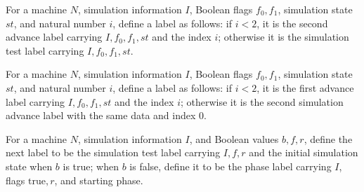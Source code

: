 \begin{definition}
\label{Complexity.Codec.sA2}
\leanok
{}
For a machine $N$, simulation information $I$, Boolean flags $f_0,f_1$, simulation state
$st$, and natural number $i$, define a label as follows: if $i<2$, it is the second
advance label carrying $I,f_0,f_1,st$ and the index $i$; otherwise it is the simulation
test label carrying $I,f_0,f_1,st$.
\end{definition}

\begin{definition}
\label{Complexity.Codec.sA1}
\leanok
{}
For a machine $N$, simulation information $I$, Boolean flags $f_0,f_1$, simulation state
$st$, and natural number $i$, define a label as follows: if $i<2$, it is the first
advance label carrying $I,f_0,f_1,st$ and the index $i$; otherwise it is the second
simulation advance label with the same data and index $0$.
\end{definition}

\begin{definition}
\label{Complexity.Codec.pmNext}
\leanok
{}
For a machine $N$, simulation information $I$, and Boolean values $b,f,r$, define the
next label to be the simulation test label carrying $I,f,r$ and the initial simulation
state when $b$ is true; when $b$ is false, define it to be the phase label carrying $I$,
flags $\mathrm{true},r$, and starting phase.
\end{definition}

